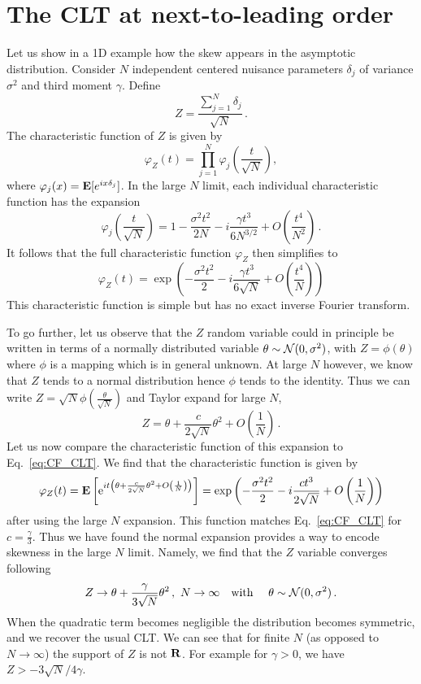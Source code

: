 \documentclass[11pt]{article}
\newcommand{\be}{\begin{equation}}
\newcommand{\ee}{\end{equation}}
\begin{document}
\appendix

\section{The CLT at next-to-leading order}
\label{app:skew}


Let us show in a 1D example how the skew appears  in the asymptotic distribution. Consider $N$ independent centered nuisance parameters $\delta_j$ of variance $\sigma^2$ and third moment $\gamma$. Define \be Z=\frac{\sum_{j=1}^N \delta_j}{\sqrt{N}}\,.
\ee
The characteristic function of $Z$ is given by
\be
\varphi_Z(t)=\prod_{j=1}^N\varphi_{j}\left(\frac{t}{\sqrt{N}}\right),
\ee
where $\varphi_{j}(x) = {\bf E}[e^{ix\delta_{j}}]$.
 In the large $N$ limit, each individual characteristic function has the expansion
\be
\varphi_{j}\left(\frac{t}{\sqrt{N}}\right)= 1-\frac{\sigma^2 t^2}{2N}-i \frac{\gamma t^3}{6 N^{3/2}} +O\left(\frac{t^4}{N^2}\right)\,.
\ee
It follows that the full characteristic function $\varphi_Z$ then simplifies to
\be
\varphi_Z(t)=\exp\left(-\frac{\sigma^2 t^2}{2}-i \frac{\gamma t^3}{6 \sqrt{N}} +O\left(\frac{t^4}{N}\right)\right) \label{eq:CF_CLT}
 \ee
 This characteristic function is simple but has no exact inverse Fourier transform.


To go further, let us observe that the $Z$ random variable could in principle be written in terms of a normally distributed variable $\theta\sim {\cal N}(0,\sigma^2)$,
 with $Z=\phi(\theta)$ where $\phi$ is a mapping which is in general unknown.  At large $N$ however, we know that $Z$ tends to a normal distribution hence $\phi$ tends to the identity. Thus we can write $Z=\sqrt{N}\phi\left(\frac{\theta}{\sqrt{N}}\right)$ and Taylor expand for large $N$,
\be
Z=\theta+\frac{c}{2\sqrt{N}}\theta^2+O\left(\frac{1}{N}\right)\,.
\ee
Let us now compare the characteristic function of  this expansion to Eq.~\eqref{eq:CF_CLT}.
We find that the characteristic function is given by
\be
\varphi_Z(t)={\bf E} \left[ \mathrm{e}^{it \left(\theta+\frac{c}{2\sqrt{N}}\theta^2+O\left(\frac{1}{N}\right)\right)} \right]
=\exp\left(-\frac{\sigma^2 t^2}{2}-i \frac{c t^3}{ 2 \sqrt{N}} +O\left(\frac{1}{N}\right)\right)
\label{eq:CF_exp}
\ee
after using the large $N$ expansion. This function matches Eq.~\eqref{eq:CF_CLT} for $c=\frac{\gamma}{3}$. Thus we have found the normal expansion provides a way to encode skewness in the large $N$ limit. Namely, we find that the $Z$ variable converges following
\be
Z\rightarrow \theta+\frac{\gamma}{3\sqrt{N}}\theta^2\,,\,\,N\rightarrow \infty  \quad \textrm{with } \quad \theta\sim{\cal N}(0,\sigma^2)\,.
\ee
When the quadratic term becomes negligible the distribution becomes symmetric, and we recover the usual CLT.
We can see that  for finite $N$ (as opposed to $N\rightarrow \infty$) the support of $Z$ is not $\bf R$. For example for $\gamma>0$, we have
$Z > -3\sqrt{N}/4\gamma$.
\end{document}
